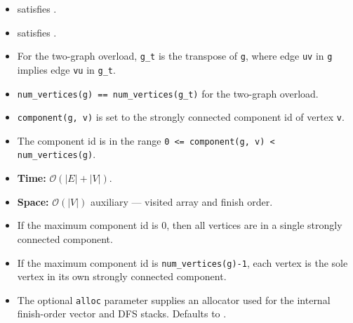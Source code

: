 \begin{itemdescr}
      \pnum\mandates
            \begin{itemize}
                  \item {} satisfies .
                  \item {} satisfies .
            \end{itemize}
      \pnum\preconditions
            \begin{itemize}
                  \item
                        For the two-graph overload, \lstinline{g_t} is the transpose of \lstinline{g}, where edge \lstinline{uv} in \lstinline{g} implies edge \lstinline{vu} in \lstinline{g_t}.
            \end{itemize}
      \pnum\hardprecond
            \begin{itemize}
                  \item
                        \lstinline{num_vertices(g) == num_vertices(g_t)} for the two-graph overload.
            \end{itemize}
      \pnum\effects
            \begin{itemize}
                  \item
                        \lstinline{component(g, v)} is set to the strongly connected component id of vertex \lstinline{v}.
                  \item
                        The component id is in the range \lstinline{0 <= component(g, v) < num_vertices(g)}.
            \end{itemize}
      \pnum\complexity
            \begin{itemize}
                  \item \textbf{Time:} $\mathcal{O}(|E|+|V|)$.
                  \item \textbf{Space:} $\mathcal{O}(|V|)$ auxiliary --- visited array and finish order.
            \end{itemize}
      \pnum\remarks 
            \begin{itemize}
                  \item
                        If the maximum component id is 0, then all vertices are in a single strongly connected component.
                  \item
                        If the maximum component id is \lstinline{num_vertices(g)-1}, each vertex is the sole vertex in its 
                        own strongly connected component.
                  \item The optional \lstinline{alloc} parameter supplies an allocator used for
                        the internal finish-order vector and DFS stacks.  Defaults to
                        .
            \end{itemize}
\end{itemdescr}

